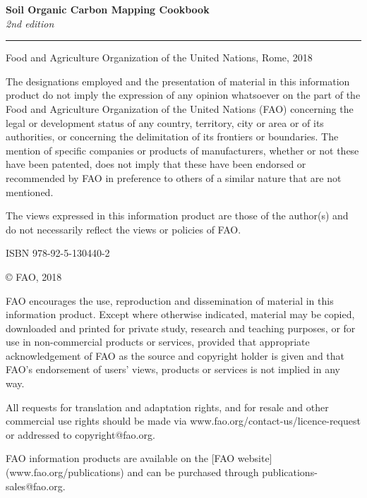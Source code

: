 \documentclass[
  10pt,
  b5paper,
]{book}
\author{MAPPING OF SALT-AFFECTED SOILS - Technical manual, Rome, 2020}
\date{}
\begin{document}
\pagestyle{plain}

\begin{titlepage}
    \begin{center}
        \vspace*{4cm}
        \Large

        \textcolor{astral}{\textbf{Soil Organic Carbon Mapping Cookbook\\}}
        \vspace{0.5cm}
        \normalsize
        \emph{2nd edition}
        \vfill
        \noindent
        {\color{astral}\rule{\linewidth}{0.5mm} }

        Food and Agriculture Organization of the United Nations, Rome, 2018
    \end{center}
\end{titlepage}

\clearpage
\thispagestyle{empty}

\vfill
{\footnotesize
\vspace*{4cm}
\vfill
The designations employed and the presentation of material in this information product do not imply the expression of any opinion whatsoever on the part of the Food and Agriculture Organization of the United Nations (FAO) concerning the legal or development status of any country, territory, city or area or of its authorities, or concerning the delimitation of its frontiers or boundaries. The mention of specific companies or products of manufacturers, whether or not these have been patented, does not imply that these have been endorsed or recommended by FAO in preference to others of a similar nature that are not mentioned.

The views expressed in this information product are those of the author(s) and do not necessarily reflect the views or policies of FAO.

ISBN 978-92-5-130440-2

\copyright \xspace FAO, 2018

FAO encourages the use, reproduction and dissemination of material in this information product. Except where otherwise indicated, material may be copied, downloaded and printed for private study, research and teaching purposes, or for use in non-commercial products or services, provided that appropriate acknowledgement of FAO as the source and copyright holder is given and that FAO’s endorsement of users’ views, products or services is not implied in any way.

All requests for translation and adaptation rights, and for resale and other commercial use rights should be made via www.fao.org/contact-us/licence-request or addressed to copyright@fao.org.


FAO information products are available on the [FAO website](www.fao.org/publications) and can be purchased through publications-sales@fao.org.
}
\end{document}
